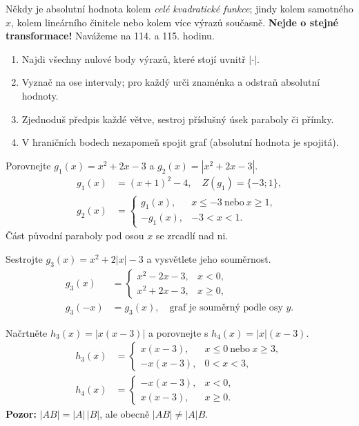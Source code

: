 \documentclass[11pt,a4paper]{article}
\begin{document}
Někdy je absolutní hodnota kolem \emph{celé kvadratické funkce}; jindy kolem
samotného $x$, kolem lineárního činitele nebo kolem více výrazů současně.
\textbf{Nejde o stejné transformace!} Navážeme na 114. a 115. hodinu.
\begin{enumerate}[label=\arabic*)]
\item Najdi všechny nulové body výrazů, které stojí uvnitř $|\cdot|$.
\item Vyznač na ose intervaly; pro každý urči znaménka a odstraň absolutní hodnoty.
\item Zjednoduš předpis každé větve, sestroj příslušný úsek paraboly či přímky.
\item V hraničních bodech nezapomeň spojit graf (absolutní hodnota je spojitá).
\end{enumerate}
\begin{prikladReseniBox}[title={Příklad 1}]
Porovnejte $g_1(x)=x^2+2x-3$ a $g_2(x)=|x^2+2x-3|$.
\tcblower
\[
\begin{aligned}
g_1(x)&=(x+1)^2-4,\quad Z(g_1)=\{-3;1\},\\
g_2(x)&=\begin{cases}g_1(x),&x\le-3\ \text{nebo}\ x\ge1,\\-g_1(x),&-3<x<1.\end{cases}
\end{aligned}
\]
Část původní paraboly pod osou $x$ se zrcadlí nad ni.
\end{prikladReseniBox}
\begin{prikladReseniBox}[title={Příklad 2}]
Sestrojte $g_3(x)=x^2+2|x|-3$ a vysvětlete jeho souměrnost.
\tcblower
\[
\begin{aligned}
g_3(x)&=\begin{cases}x^2-2x-3,&x<0,\\x^2+2x-3,&x\ge0,\end{cases}\\
g_3(-x)&=g_3(x),\quad \text{graf je souměrný podle osy }y.
\end{aligned}
\]
\end{prikladReseniBox}
\begin{prikladReseniBox}[title={Příklad 3}]
Načrtněte $h_3(x)=|x(x-3)|$ a porovnejte s $h_4(x)=|x|(x-3)$.
\tcblower
\[
\begin{aligned}
h_3(x)&=\begin{cases}x(x-3),&x\le0\ \text{nebo}\ x\ge3,\\-x(x-3),&0<x<3,\end{cases}\\
h_4(x)&=\begin{cases}-x(x-3),&x<0,\\x(x-3),&x\ge0.\end{cases}
\end{aligned}
\]
\textbf{Pozor:} $|AB|=|A|\,|B|$, ale obecně $|AB|\ne|A|B$.
\end{prikladReseniBox}
\end{document}
